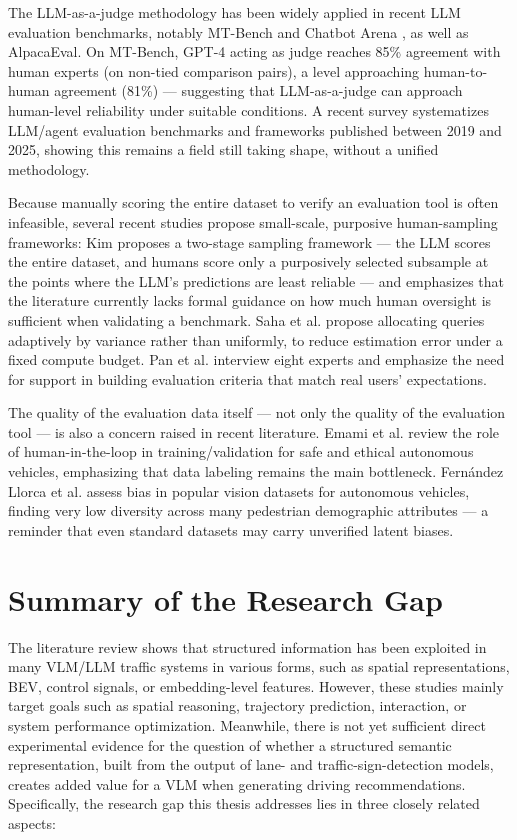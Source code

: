 \documentclass[12pt,a4paper]{report}
\begin{document}
The LLM-as-a-judge methodology has been widely applied in recent LLM evaluation benchmarks, notably MT-Bench and Chatbot Arena \cite{zheng2023mtbench}, as well as AlpacaEval. On MT-Bench, GPT-4 acting as judge reaches 85\% agreement with human experts (on non-tied comparison pairs), a level approaching human-to-human agreement (81\%) --- suggesting that LLM-as-a-judge can approach human-level reliability under suitable conditions. A recent survey \cite{ferrag2025review} systematizes LLM/agent evaluation benchmarks and frameworks published between 2019 and 2025, showing this remains a field still taking shape, without a unified methodology.

Because manually scoring the entire dataset to verify an evaluation tool is often infeasible, several recent studies propose small-scale, purposive human-sampling frameworks: Kim \cite{kim2026augmenting} proposes a two-stage sampling framework --- the LLM scores the entire dataset, and humans score only a purposively selected subsample at the points where the LLM's predictions are least reliable --- and emphasizes that the literature currently lacks formal guidance on how much human oversight is sufficient when validating a benchmark. Saha et al. \cite{saha2026budget} propose allocating queries adaptively by variance rather than uniformly, to reduce estimation error under a fixed compute budget. Pan et al. \cite{pan2024human} interview eight experts and emphasize the need for support in building evaluation criteria that match real users' expectations.

The quality of the evaluation data itself --- not only the quality of the evaluation tool --- is also a concern raised in recent literature. Emami et al. \cite{emami2024humanintheloop} review the role of human-in-the-loop in training/validation for safe and ethical autonomous vehicles, emphasizing that data labeling remains the main bottleneck. Fern{\'a}ndez Llorca et al. \cite{fernandezllorca2024bias} assess bias in popular vision datasets for autonomous vehicles, finding very low diversity across many pedestrian demographic attributes --- a reminder that even standard datasets may carry unverified latent biases.

\section{Summary of the Research Gap}

The literature review shows that structured information has been exploited in many VLM/LLM traffic systems in various forms, such as spatial representations, BEV, control signals, or embedding-level features. However, these studies mainly target goals such as spatial reasoning, trajectory prediction, interaction, or system performance optimization. Meanwhile, there is not yet sufficient direct experimental evidence for the question of whether a structured semantic representation, built from the output of lane- and traffic-sign-detection models, creates added value for a VLM when generating driving recommendations. Specifically, the research gap this thesis addresses lies in three closely related aspects:
\end{document}
